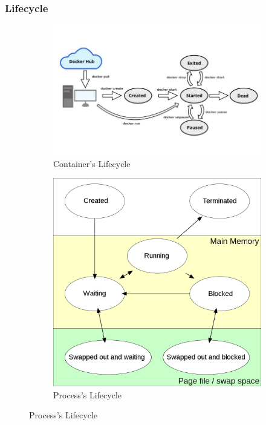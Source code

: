 \documentclass{beamer}
\begin{document}
\begin{frame}
    \frametitle{Lifecycle}
    \begin{figure}
        \centering
        \begin{subfigure}[b]{0.6\textwidth}
            \includegraphics[width=\textwidth]{docker-lifecycle.jpeg}
            \caption{Container's Lifecycle}
        \end{subfigure}
        \hfill
        \begin{subfigure}[b]{0.39\textwidth}
            \includegraphics[width=\textwidth]{Process_states.png}
            \caption{Process's Lifecycle}
        \end{subfigure}
    \end{figure}
    \cite{docker-lifecycle,process-lifecycle}
\end{frame}
\end{document}

